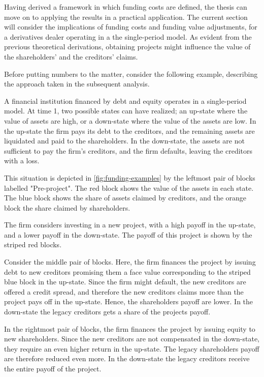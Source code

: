\documentclass[main.tex]{subfiles}
\begin{document}
    Having derived a framework in which funding costs are defined, 
    the thesis can move on to applying the results in a practical application.
    The current section will consider the implications of funding costs and funding value adjustments,
    for a derivatives dealer operating in a the single-period model.
    As evident from the previous theoretical derivations, 
    obtaining projects might influence the value of the shareholders' and the creditors' claims.

    Before putting numbers to the matter, consider the following example,
    describing the approach taken in the subsequent analysis.

    \begin{example}
    
    A financial institution financed by debt and equity operates in a single-period model.
    At time 1, two possible states can have realized;
    an up-state where the value of assets are high,
    or a down-state where the value of the assets are low.
    In the up-state the firm pays its debt to the creditors,
    and the remaining assets are liquidated and paid to the shareholders.
    In the down-state, the assets are not sufficient to pay the firm's creditors, 
    and the firm defaults, leaving the creditors with a loss. 

    This situation is depicted in \cref{fig:funding-examples} 
    by the leftmost pair of blocks labelled "Pre-project". 
    The \textcolor{wtf-red}{red block} shows the value of the assets in each state.
    The \textcolor{wtf-blue}{blue block} shows the share of assets claimed by creditors,
    and the \textcolor{wtf-orange}{orange block} the share claimed by shareholders.

    The firm considers investing in a new project, with a high payoff in the up-state,
    and a lower payoff in the down-state.
    The payoff of this project is shown by the striped red blocks.

    Consider the middle pair of blocks.
    Here, the firm finances the project by issuing debt to new creditors
    promising them a face value corresponding to the striped blue block in the up-state.
    Since the firm might default, the new creditors are offered a credit spread,
    and therefore the new creditors claims more than the project pays off in the up-state.
    Hence, the shareholders payoff are lower. 
    In the down-state the legacy creditors gets a share of the projects payoff.

    In the rightmost pair of blocks,
    the firm finances the project by issuing equity to new shareholders.
    Since the new creditors are not compensated in the down-state,
    they require an even higher return in the up-state.
    The legacy shareholders payoff are therefore reduced even more.
    In the down-state the legacy creditors receive the entire payoff of the project.
    

    \end{example}
\end{document}
